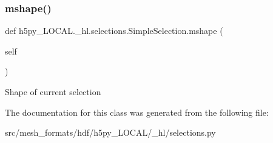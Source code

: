 \subsubsection{\texorpdfstring{mshape()}{mshape()}}
{\footnotesize\ttfamily def h5py\+\_\+\+L\+O\+C\+A\+L.\+\_\+hl.\+selections.\+Simple\+Selection.\+mshape (\begin{DoxyParamCaption}\item[{}]{self }\end{DoxyParamCaption})}

\begin{DoxyVerb}Shape of current selection \end{DoxyVerb}
 

The documentation for this class was generated from the following file\+:\begin{DoxyCompactItemize}
\item 
src/mesh\+\_\+formats/hdf/h5py\+\_\+\+L\+O\+C\+A\+L/\+\_\+hl/selections.\+py\end{DoxyCompactItemize}

